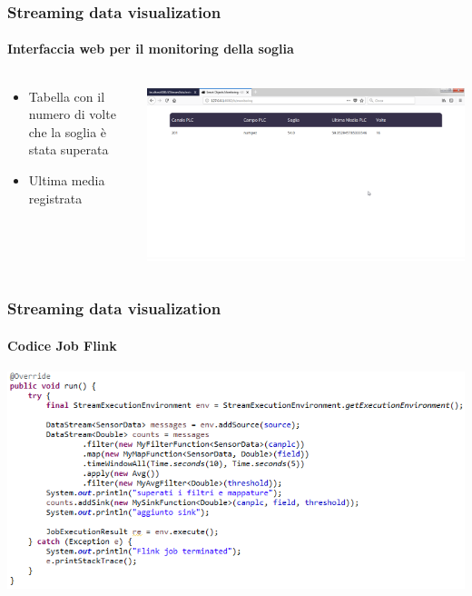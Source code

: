 \documentclass{beamer}
\begin{document}
\begin{frame}
\frametitle{Streaming data visualization}
\framesubtitle{Interfaccia web per il monitoring della soglia}
\begin{columns}[T] %
	\begin{column}{.3\textwidth}
		\begin{itemize}
			\item Tabella con il numero di volte che la soglia è stata superata
			\item Ultima media registrata
		\end{itemize}
	\end{column}%
	\hfill%
	\begin{column}{.66\textwidth}
		\includegraphics[width=1\textwidth]{images/pagina-monitoraggio-web.png}
	\end{column}%
\end{columns}

\end{frame}

\begin{frame}
\frametitle{Streaming data visualization}
\framesubtitle{Codice Job Flink}
\includegraphics[width=1\textwidth]{images/flink-job.png}
\end{frame}
\end{document}

